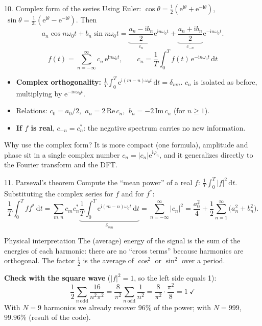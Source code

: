 \documentclass[aspectratio=169,10pt]{beamer}
\newcommand{\ii}{\mathrm{i}}
\newcommand{\ee}{\mathrm{e}}
\newcommand{\dd}{\,\mathrm{d}}
\begin{document}
\begin{frame}{10. Complex form of the series}
  \small
  Using Euler: $\cos\theta=\tfrac12(\ee^{\ii\theta}+\ee^{-\ii\theta})$, $\ \sin\theta=\tfrac1{2\ii}(\ee^{\ii\theta}-\ee^{-\ii\theta})$. Then
  \[
    a_n\cos n\omega_0t+b_n\sin n\omega_0t=\underbrace{\frac{a_n-\ii b_n}{2}}_{c_n}\ee^{\ii n\omega_0 t}+\underbrace{\frac{a_n+\ii b_n}{2}}_{c_{-n}}\ee^{-\ii n\omega_0 t}.
  \]
  \[
    \boxed{f(t)=\sum_{n=-\infty}^{\infty}c_n\,\ee^{\ii n\omega_0 t},\qquad
    c_n=\frac1T\int_{0}^{T}f(t)\,\ee^{-\ii n\omega_0 t}\dd t}
  \]
  \begin{itemize}
    \item \textbf{Complex orthogonality:} $\frac1T\int_0^T\ee^{\ii (m-n)\omega_0 t}\dd t=\delta_{mn}$. $c_n$ is isolated as before, multiplying by $\ee^{-\ii n\omega_0t}$.
    \item Relations: $c_0=a_0/2$, $\ a_n=2\,\mathrm{Re}\,c_n$, $\ b_n=-2\,\mathrm{Im}\,c_n$ (for $n\ge1$).
    \item \textbf{If $f$ is real}, $c_{-n}=c_n^{*}$: the negative spectrum carries no new information.
  \end{itemize}
  \begin{keybox}{Why use the complex form?}
    It is more compact (one formula), amplitude and phase sit in a single complex number $c_n=|c_n|\ee^{\ii\varphi_n}$, and it generalizes directly to the Fourier transform and the DFT.
  \end{keybox}
\end{frame}

\begin{frame}{11. Parseval's theorem}
  \small
  Compute the ``mean power'' of a real $f$: $\frac1T\int_0^T|f|^2\dd t$. Substituting the complex series for $f$ and for $f^*$:
  \[
    \frac1T\int_0^T\! f f^{*}\dd t=\sum_{m,n}c_m c_n^{*}\underbrace{\frac1T\int_0^T\!\ee^{\ii(m-n)\omega_0t}\dd t}_{\delta_{mn}}
    =\sum_{n=-\infty}^{\infty}|c_n|^2=\frac{a_0^2}{4}+\frac12\sum_{n=1}^{\infty}\big(a_n^2+b_n^2\big).
  \]
  \begin{keybox}{Physical interpretation}
    The (average) energy of the signal is the sum of the energies of each harmonic: there are no ``cross terms'' because harmonics are orthogonal. The factor $\frac12$ is the average of $\cos^2$ or $\sin^2$ over a period.
  \end{keybox}
  \textbf{Check with the square wave} ($|f|^2=1$, so the left side equals 1):
  \[
    \frac12\sum_{n\ \text{odd}}\frac{16}{n^2\pi^2}=\frac{8}{\pi^2}\sum_{n\ \text{odd}}\frac1{n^2}=\frac8{\pi^2}\cdot\frac{\pi^2}{8}=1\ \checkmark
  \]
  With $N=9$ harmonics we already recover $96\%$ of the power; with $N=999$, $99.96\%$ (result of the code).
\end{frame}
\end{document}
